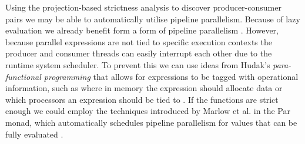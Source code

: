 Using the projection-based strictness analysis to discover producer-consumer
pairs we may be able to automatically utilise pipeline parallelism. Because of
lazy evaluation we already benefit form a form of pipeline parallelism
\citep{whyFPmatters}. However, because parallel expressions are not tied to
specific execution contexts  the producer and consumer threads can easily interrupt
each other due to the runtime system scheduler. To prevent this we can use
ideas from Hudak's \emph{para-functional programming} that allows for
expressions to be tagged with operational information, such as where in memory
the expression should allocate data or which processors an expression should be
tied to \citep{hudak1986functional}. If the functions are strict enough we could
employ the techniques introduced by Marlow et al. in the Par monad, which
automatically schedules pipeline parallelism for values that can be fully
evaluated \citep{marlow2011monad}.
